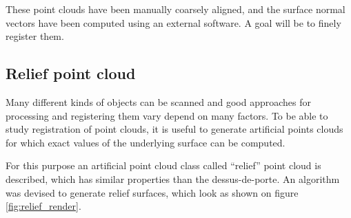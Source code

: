 These point clouds have been manually coarsely aligned, and the surface normal vectors have been computed using an external software. A goal will be to finely register them.

\subsection{Relief point cloud} \label{sec:relief}
Many different kinds of objects can be scanned and good approaches for processing and registering them vary depend on many factors. To be able to study registration of point clouds, it is useful to generate artificial points clouds for which exact values of the underlying surface can be computed.

For this purpose an artificial point cloud class called ``relief'' point cloud is described, which has similar properties than the dessus-de-porte. An algorithm was devised to generate relief surfaces, which look as shown on figure \ref{fig:relief_render}.

